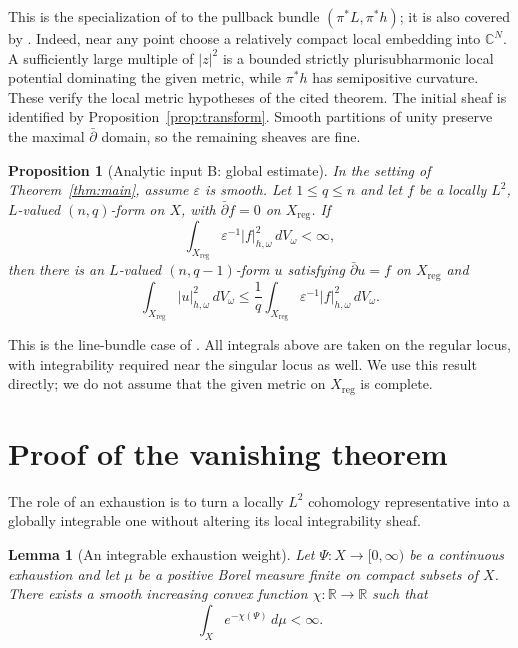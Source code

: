 \documentclass[11pt,a4paper,reqno]{amsart}
\newtheorem{proposition}[theorem]{Proposition}
\newtheorem{lemma}[theorem]{Lemma}
\theoremstyle{definition}
\theoremstyle{remark}
\numberwithin{equation}{section}
\newcommand{\reg}{\mathrm{reg}}
\newcommand{\db}{\bar\partial}
\newcommand{\dV}{\,dV_\omega}
\begin{document}
\noindent
This is the specialization of \cite[Theorem~1.3]{ShentuZhao} to the
pullback bundle $(\pi^*L,\pi^*h)$; it is also covered by
\cite[Theorem~1.1]{Watanabe}. Indeed, near any point choose a relatively
compact local embedding into $\mathbb C^N$. A sufficiently large multiple
of $|z|^2$ is a bounded strictly plurisubharmonic local potential dominating
the given metric, while $\pi^*h$ has semipositive curvature. These verify
the local metric hypotheses of the cited theorem. The initial sheaf is
identified by Proposition~\ref{prop:transform}. Smooth partitions of unity
preserve the maximal $\db$ domain, so the remaining sheaves are fine.

\begin{proposition}[Analytic input B: global estimate]
\label{prop:estimate}
In the setting of Theorem~\ref{thm:main}, assume $\varepsilon$ is smooth.
Let $1\leq q\leq n$ and let $f$ be a locally $L^2$, $L$-valued
$(n,q)$-form on $X$, with $\db f=0$ on $X_{\reg}$. If
\begin{equation}\label{eq:finiteinput}
 \int_{X_{\reg}}\varepsilon^{-1}|f|_{h,\omega}^2\dV<\infty,
\end{equation}
then there is an $L$-valued $(n,q-1)$-form $u$ satisfying $\db u=f$ on
$X_{\reg}$ and
\begin{equation}\label{eq:estimate}
 \int_{X_{\reg}}|u|_{h,\omega}^2\dV
 \leq \frac1q\int_{X_{\reg}}
             \varepsilon^{-1}|f|_{h,\omega}^2\dV.
\end{equation}
\end{proposition}

\noindent
This is the line-bundle case of \cite[Theorem~1.3]{Watanabe}. All
integrals above are taken on the regular locus, with integrability
required near the singular locus as well. We use this result directly;
we do not assume that the given metric on $X_{\reg}$ is complete.

\section{Proof of the vanishing theorem}

The role of an exhaustion is to turn a locally $L^2$ cohomology
representative into a globally integrable one without altering its local
integrability sheaf.

\begin{lemma}[An integrable exhaustion weight]\label{lem:weight}
Let $\Psi:X\to[0,\infty)$ be a continuous exhaustion and let $\mu$ be a
positive Borel measure finite on compact subsets of $X$. There exists a
smooth increasing convex function $\chi:\mathbb R\to\mathbb R$ such that
\begin{equation}\label{eq:exhaustionweight}
 \int_X e^{-\chi(\Psi)}\,d\mu<\infty.
\end{equation}
\end{lemma}
\end{document}
